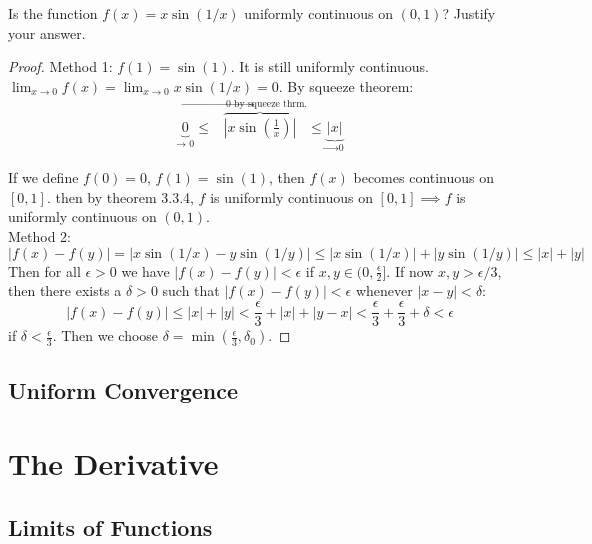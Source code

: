 \documentclass[12pt]{book}
\newenvironment{exercise}[2][Exercise]{\begin{trivlist}
\item[\hskip \labelsep {\bfseries #1}\hskip \labelsep {\bfseries #2.}]}{\end{trivlist}}
\begin{document}
\begin{exercise}{3.3.10}
    Is the function $f(x)=x \sin(1/x)$ uniformly continuous on $(0,1)$? Justify your answer. \\
    
    \begin{proof}
    Method 1: $f(1)=\sin(1)$. It is still uniformly continuous. $\lim_{x \to 0} f(x)= \lim_{x \to 0} x \sin(1/x) = 0$. By squeeze theorem:
		\begin{align*}
		\underbrace{0}_\text{$\to$ 0} \leq \overbrace{|x \sin \left( \frac{1}{x} \right) |}^\text{$\to$ 0 by squeeze thrm.} \leq \underbrace{|x|}_\text{$\to$ 0}
		\end{align*}		       
         
    If we define $f(0)=0$, $f(1)=\sin(1)$, then $f(x)$ becomes continuous on $[0,1]$. then by theorem 3.3.4, $f$ is uniformly continuous on $[0,1] \implies f$ is uniformly continuous on $(0,1)$.\\
    Method 2: 
        \[ |f(x)-f(y)| = |x \sin(1/x) - y \sin(1/y)| \leq |x \sin(1/x)| + |y \sin(1/y)| \leq |x|+|y| \]
    Then for all $\epsilon>0$ we have $|f(x)-f(y)|<\epsilon$ if $x,y \in (0,\frac{\epsilon}{2}]$. If now $x,y > \epsilon/3$, then there exists a $\delta>0$ such that $|f(x)-f(y)| <\epsilon$ whenever $|x-y| < \delta$: 
        \[ |f(x)-f(y)| \leq |x|+|y| < \frac{\epsilon}{3} + |x| + |y-x| < \frac{\epsilon}{3} + \frac{\epsilon}{3}+ \delta < \epsilon \]
    if $\delta< \frac{\epsilon}{3}$. Then we choose $\delta= \min(\frac{\epsilon}{3}, \delta_0)$.
    \end{proof}
\end{exercise}


\section{Uniform Convergence}



\chapter{The Derivative}
\section{Limits of Functions}
\end{document}
